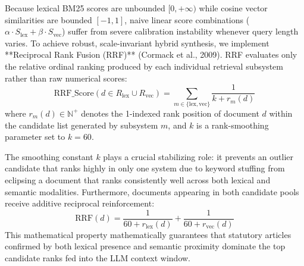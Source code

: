 \documentclass[12pt,a4paper]{report}
\begin{document}
Because lexical BM25 scores are unbounded $[0, +\infty)$ while cosine vector similarities are bounded $[-1, 1]$, naive linear score combinations ($\alpha \cdot S_{\text{lex}} + \beta \cdot S_{\text{vec}}$) suffer from severe calibration instability whenever query length varies. To achieve robust, scale-invariant hybrid synthesis, we implement **Reciprocal Rank Fusion (RRF)** (Cormack et al., 2009). RRF evaluates only the relative ordinal ranking produced by each individual retrieval subsystem rather than raw numerical scores:
\begin{equation}
\text{RRF\_Score}(d \in R_{\text{lex}} \cup R_{\text{vec}}) = \sum_{m \in \{\text{lex}, \text{vec}\}} \frac{1}{k + r_m(d)}
\label{eq:rrf}
\end{equation}
where $r_m(d) \in \mathbb{N}^+$ denotes the 1-indexed rank position of document $d$ within the candidate list generated by subsystem $m$, and $k$ is a rank-smoothing parameter set to $k = 60$. 

The smoothing constant $k$ plays a crucial stabilizing role: it prevents an outlier candidate that ranks highly in only one system due to keyword stuffing from eclipsing a document that ranks consistently well across both lexical and semantic modalities. Furthermore, documents appearing in both candidate pools receive additive reciprocal reinforcement:
\begin{equation}
\text{RRF}(d) = \frac{1}{60 + r_{\text{lex}}(d)} + \frac{1}{60 + r_{\text{vec}}(d)}
\label{eq:rrf_additive}
\end{equation}
This mathematical property mathematically guarantees that statutory articles confirmed by both lexical presence and semantic proximity dominate the top candidate ranks fed into the LLM context window.
\end{document}
